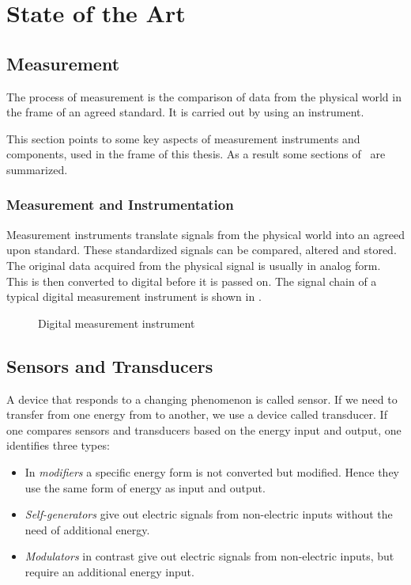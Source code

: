 \chapter{State of the Art%
  \label{chap:\currfilebase}}

\section{Measurement}
The process of measurement is the comparison of data from the physical world in the frame of an agreed standard. It is carried out by using an instrument.

This section points to some key aspects of measurement instruments and components, used in the frame of this thesis. As a result some sections of~\cite{webster2018measurement} are summarized.

\subsection{Measurement and Instrumentation}
Measurement instruments translate signals from the physical world into an agreed upon standard. These standardized signals can be compared, altered and stored.
The original data acquired from the physical signal is usually in analog form. This is then converted to digital before it is passed on. The signal chain of a typical digital measurement instrument is shown in .

\begin{figure}[!htb]
  \centering
  
  \caption[Digital instrument]{Digital measurement instrument%
    \label{fig:digital_instrument}}
\end{figure}

\section{Sensors and Transducers}
A device that responds to a changing phenomenon is called sensor. If we need to transfer from one energy from to another, we use a device called transducer. If one compares sensors and transducers based on the energy input and output, one identifies three types:
\begin{itemize}
  \item In \emph{modifiers} a specific energy form is not converted but modified. Hence they use the same form of energy as input and output.
  \item \emph{Self-generators} give out electric signals from non-electric inputs without the need of additional energy.
  \item \emph{Modulators} in contrast give out electric signals from non-electric inputs, but require an additional energy input.
\end{itemize}

